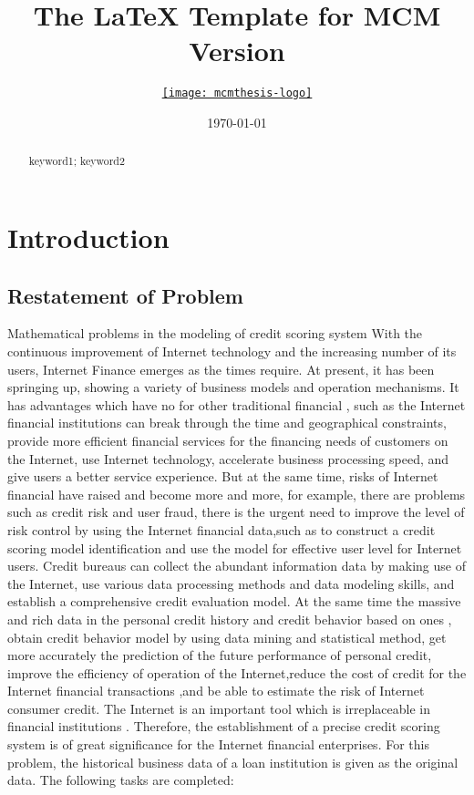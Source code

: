 \documentclass{mcmthesis}
\title{The \LaTeX{} Template for MCM Version \MCMversion}
\author{\small \href{http://www.latexstudio.net/}
  {\texttt{[image: mcmthesis-logo]}}}
\date{\today}
\begin{document}
\begin{abstract}
\lipsum[1]
\begin{keywords}
keyword1; keyword2
\end{keywords}
\end{abstract}
\maketitle
\section{Introduction}
\subsection{Restatement of Problem}
Mathematical problems in the modeling of credit scoring system
With the continuous improvement of Internet technology and the increasing number of its users, Internet Finance emerges as the times require. At present, it has been springing up, showing a variety of business models and operation mechanisms. It has advantages which have no for other traditional financial , such as the Internet financial institutions can break through the time and geographical constraints,  provide more efficient financial services for the financing needs of customers on the Internet,  use Internet technology, accelerate business processing speed, and give users a better service experience. But at the same time, risks of Internet financial have raised and become more and more, for example, there are problems such as credit risk and user fraud, there is the urgent need to improve the level of risk control by using the Internet financial data,such as to construct a credit scoring model identification and use the model for effective user level for Internet users.
Credit bureaus can collect the abundant information data by making use of  the Internet, use various data processing methods and data modeling skills, and establish a comprehensive credit evaluation model. At the same time the massive and rich data in the personal credit history and credit behavior based on ones , obtain credit behavior model by using data mining and statistical method,  get more accurately the prediction of the future performance of personal credit, improve the efficiency of operation of the Internet,reduce the cost of credit for the Internet financial transactions ,and be able to estimate the risk of Internet consumer credit. The Internet is an important tool which is irreplaceable in financial institutions . Therefore, the establishment of a precise credit scoring system is of great significance for the Internet financial enterprises. For this problem, the historical business data of a loan institution is given as the original data. The following tasks are completed:
\end{document}
